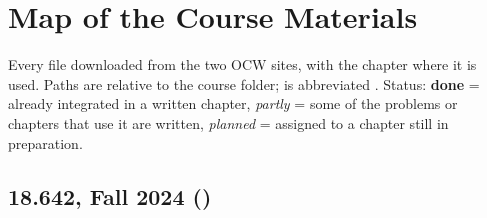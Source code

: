 \chapter{Map of the Course Materials}\label{app:materials}

Every file downloaded from the two OCW sites, with the chapter where it is used. Paths are relative to
the course folder;  is abbreviated . Status: \textbf{done} = already
integrated in a written chapter, \emph{partly} = some of the problems or chapters that use it are written, \emph{planned} = assigned to a chapter still in preparation.

\newcommand{\done}{\textbf{done}}
\newcommand{\planned}{\emph{planned}}
\newcommand{\partly}{\emph{partly}}

\section*{18.642, Fall 2024 ()}
